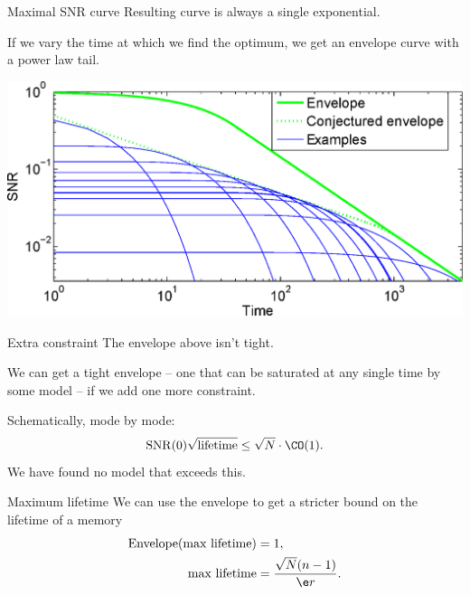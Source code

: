 \documentclass[final,hyperref={pdfpagelabels=false,bookmarks=false}]{beamer}
\DeclareMathOperator{\SNR}{SNR}
\begin{document}
\begin{frame}{}
\begin{columns}[t]
\begin{column}{0.32\linewidth}
\begin{block}{Maximal SNR curve}
 \vp Resulting curve is always a single exponential.
 
 \vp If we vary the time at which we find the optimum, we get an envelope curve with a power law tail.
 \begin{center}
 \includegraphics[width=20cm]{env.eps}
 \end{center}
%
\end{block}


\begin{block}{Extra constraint}
%
 The envelope above isn't tight.
 
 \vp We can get a tight envelope 
 -- one that can be saturated at any single time by some model -- 
 if we add one more constraint.
 
 \vp Schematically, mode by mode:
 \begin{equation*}
   \SNR(0)\sqrt{\text{lifetime}} \leq \sqrt{N}\cdot \CO(1).
 \end{equation*}
 We have found no model that exceeds this.
%
\end{block}


\begin{block}{Maximum lifetime}
%
 We can use the envelope to get a stricter bound on the lifetime of a memory
 \begin{equation*}
 \begin{aligned}
   \operatorname{Envelope}(\text{max lifetime}) &= 1, \\
   \text{max lifetime}  &= \frac{\sqrt{N}(n-1)}{\e r}.
 \end{aligned}   
 \end{equation*}
%
\end{block}


\end{column}
\end{columns}
\end{frame}
\end{document}

